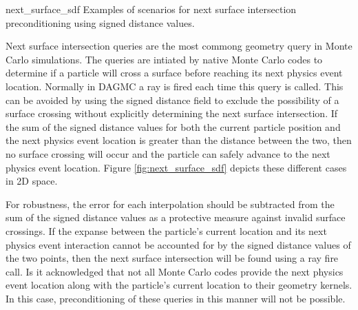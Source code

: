               {next_surface_sdf}
              {Examples of scenarios for next surface intersection preconditioning using signed distance values.}
              {
                Next surface intersection queries are the most commong geometry
                query in Monte Carlo simulations. The queries are intiated by
                native Monte Carlo codes to determine if a particle will cross a
                surface before reaching its next physics event
                location. Normally in DAGMC a ray is fired each time this query
                is called. This can be avoided by using the signed distance
                field to exclude the possibility of a surface crossing without
                explicitly determining the next surface intersection. If the sum
                of the signed distance values for both the current particle
                position and the next physics event location is greater than the
                distance between the two, then no surface crossing will occur
                and the particle can safely advance to the next physics event
                location. Figure \ref{fig:next_surface_sdf} depicts these
                different cases in 2D space.
                
                For robustness, the error for each interpolation should be
                subtracted from the sum of the signed distance values as a
                protective measure against invalid surface crossings. If the
                expanse between the particle's current location and its next
                physics event interaction cannot be accounted for by the signed
                distance values of the two points, then the next surface
                intersection will be found using a ray fire
                call. Is it acknowledged that not all
                Monte Carlo codes provide the next physics event location along
                with the particle's current location to their geometry
                kernels. In this case, preconditioning of these queries in this
                manner will not be possible.
              }

